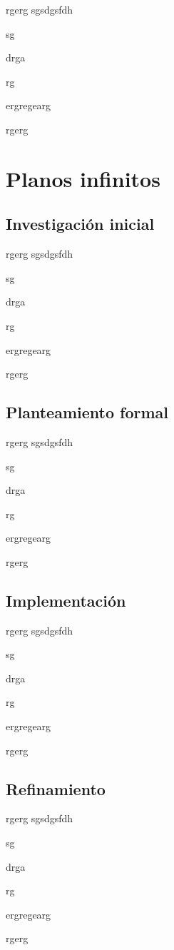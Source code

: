 rgerg
sgsdgsfdh

sg

drga

rg

ergregearg

rgerg


\section{Planos infinitos}

\subsection{Investigación inicial}

rgerg
sgsdgsfdh

sg

drga

rg

ergregearg

rgerg

\subsection{Planteamiento formal}

rgerg
sgsdgsfdh

sg

drga

rg

ergregearg

rgerg

\subsection{Implementación}

rgerg
sgsdgsfdh

sg

drga

rg

ergregearg

rgerg

\subsection{Refinamiento}

rgerg
sgsdgsfdh

sg

drga

rg

ergregearg

rgerg

